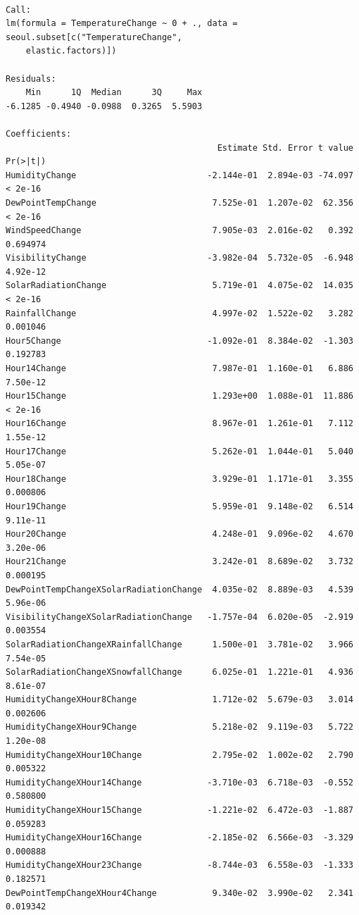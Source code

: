 \documentclass[
  letterpaper,
  DIV=11,
  numbers=noendperiod]{scrartcl}
\begin{document}
\begin{verbatim}

Call:
lm(formula = TemperatureChange ~ 0 + ., data = seoul.subset[c("TemperatureChange", 
    elastic.factors)])

Residuals:
    Min      1Q  Median      3Q     Max 
-6.1285 -0.4940 -0.0988  0.3265  5.5903 

Coefficients:
                                          Estimate Std. Error t value Pr(>|t|)
HumidityChange                          -2.144e-01  2.894e-03 -74.097  < 2e-16
DewPointTempChange                       7.525e-01  1.207e-02  62.356  < 2e-16
WindSpeedChange                          7.905e-03  2.016e-02   0.392 0.694974
VisibilityChange                        -3.982e-04  5.732e-05  -6.948 4.92e-12
SolarRadiationChange                     5.719e-01  4.075e-02  14.035  < 2e-16
RainfallChange                           4.997e-02  1.522e-02   3.282 0.001046
Hour5Change                             -1.092e-01  8.384e-02  -1.303 0.192783
Hour14Change                             7.987e-01  1.160e-01   6.886 7.50e-12
Hour15Change                             1.293e+00  1.088e-01  11.886  < 2e-16
Hour16Change                             8.967e-01  1.261e-01   7.112 1.55e-12
Hour17Change                             5.262e-01  1.044e-01   5.040 5.05e-07
Hour18Change                             3.929e-01  1.171e-01   3.355 0.000806
Hour19Change                             5.959e-01  9.148e-02   6.514 9.11e-11
Hour20Change                             4.248e-01  9.096e-02   4.670 3.20e-06
Hour21Change                             3.242e-01  8.689e-02   3.732 0.000195
DewPointTempChangeXSolarRadiationChange  4.035e-02  8.889e-03   4.539 5.96e-06
VisibilityChangeXSolarRadiationChange   -1.757e-04  6.020e-05  -2.919 0.003554
SolarRadiationChangeXRainfallChange      1.500e-01  3.781e-02   3.966 7.54e-05
SolarRadiationChangeXSnowfallChange      6.025e-01  1.221e-01   4.936 8.61e-07
HumidityChangeXHour8Change               1.712e-02  5.679e-03   3.014 0.002606
HumidityChangeXHour9Change               5.218e-02  9.119e-03   5.722 1.20e-08
HumidityChangeXHour10Change              2.795e-02  1.002e-02   2.790 0.005322
HumidityChangeXHour14Change             -3.710e-03  6.718e-03  -0.552 0.580800
HumidityChangeXHour15Change             -1.221e-02  6.472e-03  -1.887 0.059283
HumidityChangeXHour16Change             -2.185e-02  6.566e-03  -3.329 0.000888
HumidityChangeXHour23Change             -8.744e-03  6.558e-03  -1.333 0.182571
DewPointTempChangeXHour4Change           9.340e-02  3.990e-02   2.341 0.019342

\end{verbatim}
\end{document}
